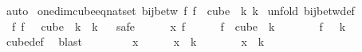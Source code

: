 \begin{isabellebody}
\ auto%
\endisatagproof
{\isafoldproof}%
%
\isadelimproof
\isanewline
%
\endisadelimproof
\isanewline
{}\isamarkupfalse%
\ one{\isacharunderscore}{\kern0pt}dim{\isacharunderscore}{\kern0pt}cube{\isacharunderscore}{\kern0pt}eq{\isacharunderscore}{\kern0pt}nat{\isacharunderscore}{\kern0pt}set{\isacharcolon}{\kern0pt}\ {\isachardoublequoteopen}bij{\isacharunderscore}{\kern0pt}betw\ {\isacharparenleft}{\kern0pt}{\isasymlambda}f{\isachardot}{\kern0pt}\ f\ {}{\isacharparenright}{\kern0pt}\ {\isacharparenleft}{\kern0pt}cube\ {}\ k{\isacharparenright}{\kern0pt}\ {\isacharbraceleft}{\kern0pt}{\isachardot}{\kern0pt}{\isachardot}{\kern0pt}{\isacharless}{\kern0pt}k{\isacharbraceright}{\kern0pt}{\isachardoublequoteclose}\isanewline
%
\isadelimproof
%
\endisadelimproof
%
\isatagproof
{}\isamarkupfalse%
\ {\isacharparenleft}{\kern0pt}unfold\ bij{\isacharunderscore}{\kern0pt}betw{\isacharunderscore}{\kern0pt}def{\isacharparenright}{\kern0pt}\isanewline
\ \ \isamarkupfalse%
\ {\isacharasterisk}{\kern0pt}{\isacharcolon}{\kern0pt}\ {\isachardoublequoteopen}{\isacharparenleft}{\kern0pt}{\isasymlambda}f{\isachardot}{\kern0pt}\ f\ {}{\isacharparenright}{\kern0pt}\ {\isacharbackquote}{\kern0pt}\ cube\ {}\ k\ {\isacharequal}{\kern0pt}\ {\isacharbraceleft}{\kern0pt}{\isachardot}{\kern0pt}{\isachardot}{\kern0pt}{\isacharless}{\kern0pt}k{\isacharbraceright}{\kern0pt}{\isachardoublequoteclose}\isanewline
\ \ \isamarkupfalse%
{\isacharparenleft}{\kern0pt}safe{\isacharparenright}{\kern0pt}\isanewline
\ \ \ \ \isamarkupfalse%
\ x\ f\isanewline
\ \ \ \ \isamarkupfalse%
\ {\isachardoublequoteopen}f\ {\isasymin}\ cube\ {}\ k{\isachardoublequoteclose}\isanewline
\ \ \ \ \isamarkupfalse%
\ \isamarkupfalse%
\ {\isachardoublequoteopen}f\ {}\ {\isacharless}{\kern0pt}\ k{\isachardoublequoteclose}\ \isamarkupfalse%
\ cube{\isacharunderscore}{\kern0pt}def\ \isamarkupfalse%
\ blast\isanewline
\ \ \isamarkupfalse%
\isanewline
\ \ \ \ \isamarkupfalse%
\ x\isanewline
\ \ \ \ \isamarkupfalse%
\ {\isachardoublequoteopen}x\ {\isacharless}{\kern0pt}\ k{\isachardoublequoteclose}\isanewline
\ \ \ \ \isamarkupfalse%
\ \isamarkupfalse%
\ {\isachardoublequoteopen}x\ {\isasymin}\ {\isacharbraceleft}{\kern0pt}{\isachardot}{\kern0pt}{\isachardot}{\kern0pt}{\isacharless}{\kern0pt}k{\isacharbraceright}{\kern0pt}{\isachardoublequoteclose}\ \isamarkupfalse%

\end{isabellebody}
